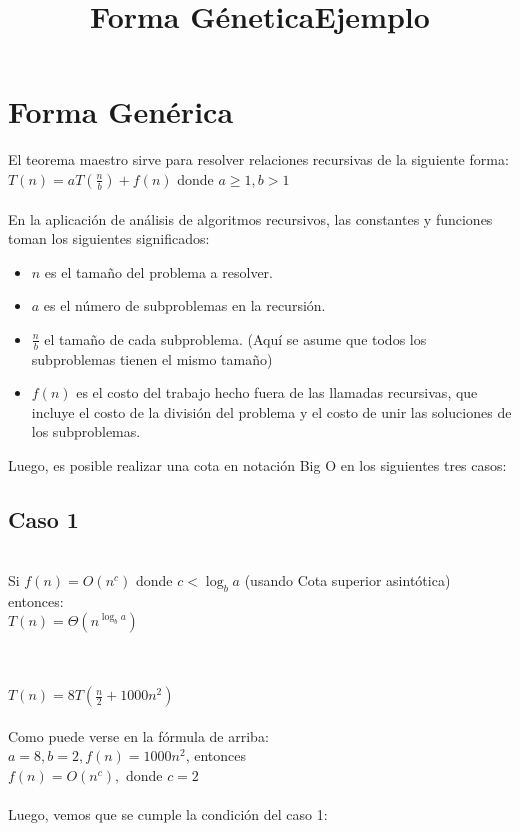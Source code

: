 \documentclass{article}
\begin{document}
\section{Forma Genérica}
El teorema maestro sirve para resolver relaciones recursivas de la siguiente forma:\\

    $T(n) = aT(\frac{n}{b})+f(n)$ donde $a \geq 1, b > 1$\\\\
En la aplicación de análisis de algoritmos recursivos, las constantes y funciones toman los siguientes significados:
\begin{itemize}
    \item $\displaystyle{n}$ es el tamaño del problema a resolver.
    \item $\displaystyle{a}$ es el número de subproblemas en la recursión.
    \item $\frac{n}{b}$ el tamaño de cada subproblema. (Aquí se asume que todos los subproblemas tienen el mismo tamaño)
    \item $\displaystyle{f(n)}$ es el costo del trabajo hecho fuera de las llamadas recursivas, que incluye el costo de la división del problema y el costo de unir las soluciones de los subproblemas.
\end{itemize}
Luego, es posible realizar una cota en notación Big O en los siguientes tres casos:
\subsection{Caso 1}
\title{\textbf{Forma Génetica}}\\
Si $\displaystyle{f(n)} = O(n^c)$ donde $c < \log_{b}{a}$ (usando Cota superior asintótica)\\
entonces:\\

$T(n) = \Theta(n^{\log_{b}{a}})$\\\\
\title{\textbf{Ejemplo}}\\

$T(n) = 8T(\frac{n}{2}+1000n^2)$\\\\
Como puede verse en la fórmula de arriba:\\

$a = 8, b=2, f(n) = 1000n^2$, entonces\\

$f(n) = O(n^c),$ donde $c=2$\\\\
Luego, vemos que se cumple la condición del caso 1:\\
\end{document}
